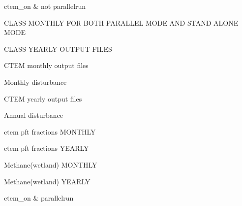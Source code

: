 ctem\+\_\+on \& not parallelrun

C\+L\+A\+S\+S M\+O\+N\+T\+H\+L\+Y F\+O\+R B\+O\+T\+H P\+A\+R\+A\+L\+L\+E\+L M\+O\+D\+E A\+N\+D S\+T\+A\+N\+D A\+L\+O\+N\+E M\+O\+D\+E

C\+L\+A\+S\+S Y\+E\+A\+R\+L\+Y O\+U\+T\+P\+U\+T F\+I\+L\+E\+S

C\+T\+E\+M monthly output files

Monthly disturbance

C\+T\+E\+M yearly output files

Annual disturbance

ctem pft fractions M\+O\+N\+T\+H\+L\+Y

ctem pft fractions Y\+E\+A\+R\+L\+Y

Methane(wetland) M\+O\+N\+T\+H\+L\+Y

Methane(wetland) Y\+E\+A\+R\+L\+Y

ctem\+\_\+on \& parallelrun 